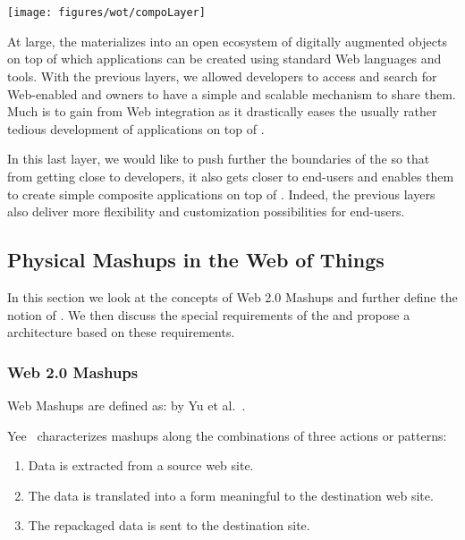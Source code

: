 \section{\compoLayer{}}\label{physicalMashups}
\begin{center}
\texttt{[image: figures/wot/compoLayer]}
\end{center}
At large, the \WoTLong{} materializes into an open ecosystem of digitally augmented objects on top of which applications can be created using standard Web languages and tools. With the previous layers, we allowed developers to access and search for Web-enabled \sts{} and owners to have a simple and scalable mechanism to share them. Much is to gain from Web integration as it drastically eases the usually rather tedious development of applications on top of \sts{}.

In this last layer, we would like to push further the boundaries of the \WoT{} so that from getting close to developers, it also gets closer to end-users and enables them to create simple composite applications on top of \sts{}. Indeed, the previous layers also deliver more flexibility and customization possibilities for end-users. 

\subsection{Physical Mashups in the Web of Things}
In this section we look at the concepts of Web 2.0 Mashups and further define the notion of \pMashups{}. We then discuss the special requirements of the \WoTLong{} and propose a \pMashups{} architecture based on these requirements.

\subsubsection{Web 2.0 Mashups}
Web Mashups are defined as:  by Yu et al.~\cite{Yu2008a}.

Yee~\cite{Yee2008} characterizes mashups along the combinations of three actions or patterns:
\begin{enumerate}
 \item Data is extracted from a source web site.
 \item The data is translated into a form meaningful to the destination web site.
 \item The repackaged data is sent to the destination site.
\end{enumerate}

